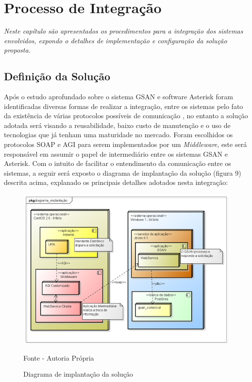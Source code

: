 \chapter[Processo de Integração]{\textbf{P}rocesso de \textbf{I}ntegração}

\textit{Neste capítulo são apresentados os procedimentos para a integração dos sistemas envolvidos, expondo o detalhes de implementação e configuração da solução proposta.}


\section{Definição da Solução}

Após o estudo aprofundado sobre o sistema GSAN e software Asterisk foram identificadas diversas formas de realizar a integração, entre os sistemas pelo fato da existência de várias protocolos possíveis de comunicação , no entanto a solução adotada será visando a reusabilidade, baixo custo de manutenção e o uso de tecnologias que já tenham uma maturidade no mercado. Foram escolhidos os protocolos SOAP e AGI para serem implementados por um \textit{Middleware}, este será responsável em assumir o papel de intermediário entre os sistemas GSAN e Asterisk. Com o intuito de facilitar o entendimento da comunicação entre os sistemas, a seguir será exposto o diagrama de implantação da solução (figura 9) descrita acima, explanado os principais detalhes adotados nesta integração:

\begin{figure}[!htb]
	\centering
	\includegraphics{figuras/diagrama_implantacao.png}
	\caption{Diagrama de implantação da solução}	
	Fonte - Autoria Própria
\end{figure}


